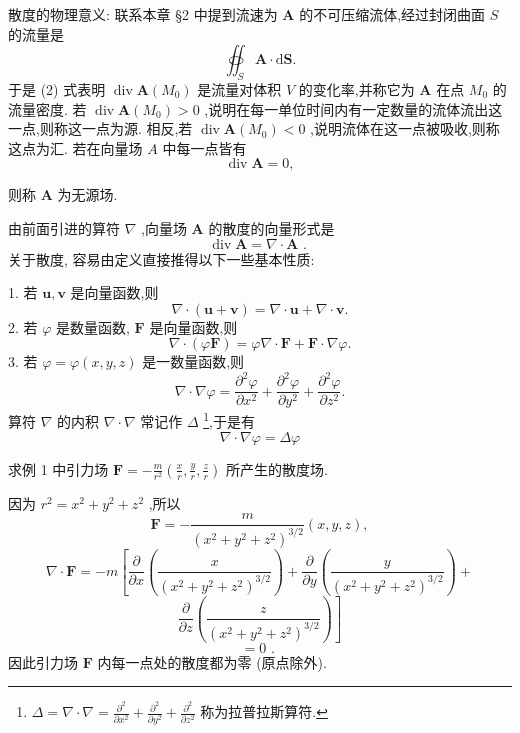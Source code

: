 散度的物理意义: 联系本章 §2 中提到流速为 \(\mathbf{A}\) 的不可压缩流体,经过封闭曲面 \(S\) 的流量是
\[
{\oiint }_{S}\mathbf{A} \cdot  \mathrm{d}\mathbf{S}.
\]
于是 (2) 式表明 \(\operatorname{div}\mathbf{A}\left( {M}_{0}\right)\) 是流量对体积 \(V\) 的变化率,并称它为 \(\mathbf{A}\) 在点 \({M}_{0}\) 的流量密度. 若 \(\operatorname{div}\mathbf{A}\left( {M}_{0}\right)  > 0\) ,说明在每一单位时间内有一定数量的流体流出这一点,则称这一点为源. 相反,若 \(\operatorname{div}\mathbf{A}\left( {M}_{0}\right)  < 0\) ,说明流体在这一点被吸收,则称这点为汇. 若在向量场 \(A\) 中每一点皆有
\[
\operatorname{div}\mathbf{A} = 0,
\]


则称 \(\mathbf{A}\) 为无源场.

由前面引进的算符 \(\nabla\) ,向量场 \(\mathbf{A}\) 的散度的向量形式是
\[
\operatorname{div}\mathbf{A} = \nabla  \cdot  \mathbf{A}\text{ . }
\]
关于散度, 容易由定义直接推得以下一些基本性质:

1. 若 \(\mathbf{u},\mathbf{v}\) 是向量函数,则
\[
\nabla  \cdot  \left( {\mathbf{u} + \mathbf{v}}\right)  = \nabla  \cdot  \mathbf{u} + \nabla  \cdot  \mathbf{v}.
\]
2. 若 \(\varphi\) 是数量函数, \(\mathbf{F}\) 是向量函数,则
\[
\nabla  \cdot  \left( {\varphi \mathbf{F}}\right)  = \varphi \nabla  \cdot  \mathbf{F} + \mathbf{F} \cdot  \nabla \varphi .
\]
3. 若 \(\varphi  = \varphi \left( {x,y,z}\right)\) 是一数量函数,则
\[
\nabla  \cdot  \nabla \varphi  = \frac{{\partial }^{2}\varphi }{\partial {x}^{2}} + \frac{{\partial }^{2}\varphi }{\partial {y}^{2}} + \frac{{\partial }^{2}\varphi }{\partial {z}^{2}}.
\]
算符 \(\nabla\) 的内积 \(\nabla  \cdot  \nabla\) 常记作 \({\Delta }\) \footnote{\(\Delta  = \nabla  \cdot  \nabla  = \frac{{\partial }^{2}}{\partial {x}^{2}} + \frac{{\partial }^{2}}{\partial {y}^{2}} + \frac{{\partial }^{2}}{\partial {z}^{2}}\) 称为拉普拉斯算符.},于是有
\[
\nabla  \cdot  \nabla \varphi  = {\Delta \varphi }
\]
\begin{example}

\end{example}
求例 1 中引力场 \(\mathbf{F} =  - \frac{m}{{r}^{2}}\left( {\frac{x}{r},\frac{y}{r},\frac{z}{r}}\right)\) 所产生的散度场.

\begin{solution}

\end{solution}
因为 \({r}^{2} = {x}^{2} + {y}^{2} + {z}^{2}\) ,所以
\[
\mathbf{F} =  - \frac{m}{{\left( {x}^{2} + {y}^{2} + {z}^{2}\right) }^{3/2}}\left( {x,y,z}\right) ,
\]
\[
\nabla  \cdot  \mathbf{F} =  - m\left\lbrack  {\frac{\partial }{\partial x}\left( \frac{x}{{\left( {x}^{2} + {y}^{2} + {z}^{2}\right) }^{3/2}}\right)  + \frac{\partial }{\partial y}\left( \frac{y}{{\left( {x}^{2} + {y}^{2} + {z}^{2}\right) }^{3/2}}\right)  + }\right.
\]
\[
\left. {\frac{\partial }{\partial z}\left( \frac{z}{{\left( {x}^{2} + {y}^{2} + {z}^{2}\right) }^{3/2}}\right) }\right\rbrack
\]
\[
= 0\text{ . }
\]
因此引力场 \(\mathbf{F}\) 内每一点处的散度都为零 (原点除外).

